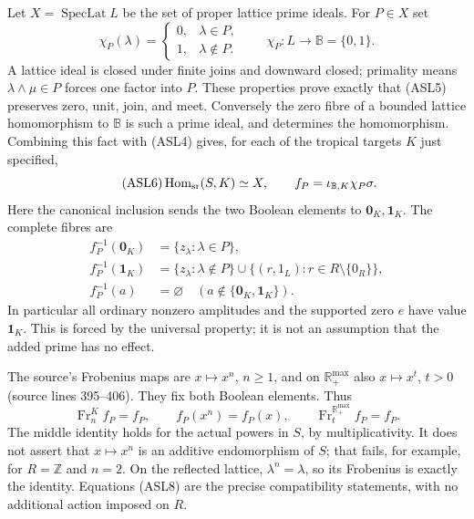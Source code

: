 Let $X=\operatorname{SpecLat}L$ be the set of proper lattice prime
ideals. For $P\in X$ set
\begin{equation}\tag{ASL5}
 \chi_P(\lambda)=
 \begin{cases}0,&\lambda\in P,\\1,&\lambda\notin P.
 \end{cases}
 \qquad \chi_P:L\longrightarrow\mathbb B=\{0,1\}.
\end{equation}
A lattice ideal is closed under finite joins and downward closed;
primality means $\lambda\wedge\mu\in P$ forces one factor into $P$.
These properties prove exactly that (ASL5) preserves zero, unit, join,
and meet. Conversely the zero fibre of a bounded lattice homomorphism
to $\mathbb B$ is such a prime ideal, and determines the homomorphism.
Combining this fact with (ASL4) gives, for each of the tropical targets
$K$ just specified,
\begin{equation}\tag{ASL6}
 \operatorname{Hom}_{\rm sr}(S,K)\simeq X,
 \qquad f_P=\iota_{\mathbb B,K}\chi_P\sigma.
\end{equation}
Here the canonical inclusion sends the two Boolean elements to
$\mathbf0_K,\mathbf1_K$. The complete fibres are
\begin{equation}\tag{ASL7}
 \begin{split}
 f_P^{-1}(\mathbf0_K)&=\{z_\lambda:\lambda\in P\},\\
 f_P^{-1}(\mathbf1_K)&=
    \{z_\lambda:\lambda\notin P\}
       \cup\{(r,1_L):r\in R\setminus\{0_R\}\},\\
 f_P^{-1}(a)&=\varnothing\quad
               (a\notin\{\mathbf0_K,\mathbf1_K\}).
 \end{split}
\end{equation}
In particular all ordinary nonzero amplitudes and the supported zero
$e$ have value $\mathbf1_K$. This is forced by the universal property;
it is not an assumption that the added prime has no effect.

The source's Frobenius maps are $x\mapsto x^n$, $n\ge1$, and on
$\mathbb R_+^{\max}$ also $x\mapsto x^t$, $t>0$ (source lines
395--406). They fix both Boolean elements. Thus
\begin{equation}\tag{ASL8}
 \operatorname{Fr}_n^K f_P=f_P,
 \qquad f_P(x^n)=f_P(x),\qquad
 \operatorname{Fr}_t^{\mathbb R_+^{\max}}f_P=f_P.
\end{equation}
The middle identity holds for the actual powers in $S$, by
multiplicativity. It does not assert that $x\mapsto x^n$ is an
additive endomorphism of $S$; that fails, for example, for $R=\mathbb Z$
and $n=2$. On the reflected lattice, $\lambda^n=\lambda$, so its
Frobenius is exactly the identity. Equations (ASL8) are the precise
compatibility statements, with no additional action imposed on $R$.

